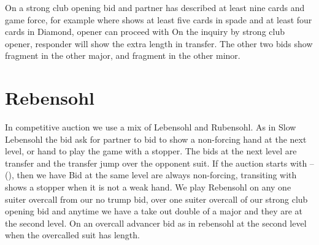 On a strong club opening bid and partner has described at least nine cards and game force, for example
where \bid{1\HS} shows at least five cards in spade and \bid{2\CS} at least four cards in Diamond, opener can proceed with
On the \bid{2\NT} inquiry by strong club opener, responder will show the extra length in transfer. The other two bids show fragment in the other major, and fragment in the other minor.
\section{Rebensohl}
In competitive auction we use a mix of Lebensohl and Rubensohl. As in Slow Lebensohl the \bid{2\NT} bid ask for partner to bid \bid{3\CS} to show a non-forcing hand at the next level, or hand to play the game with a stopper. The bids at the next level are transfer and the transfer jump over the opponent suit. If the auction starts with \bid{1\NT}–(\bid{2\SpS}), then we have
Bid at the same level are always non-forcing, transiting with \bid{2\NT} shows a stopper when it is not a weak hand. We play Rebensohl on any one suiter overcall from our no trump bid, over one suiter overcall of our strong club opening bid and anytime we have a take out double of a major and they are at the second level. On an \bid{1\NT} overcall advancer bid as in rebensohl at the second level when the overcalled suit has length. 
